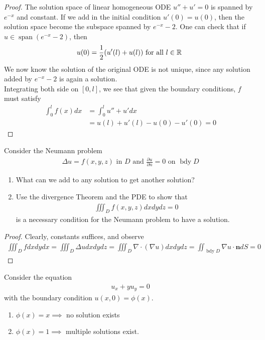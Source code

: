 \documentclass{report}
\begin{document}
\begin{proof}
The solution space of linear homogeneous ODE $u''+u'=0$  is spanned by $e^{-x}$ and constant. If we add in the initial condition  $u'(0)=u(0)$, then the solution space become the subspace spanned by $e^{-x}-2$. One can check that if $u \in\operatorname{span}(e^{-x}-2)$, then 
\begin{align*}
u(0)=\frac{1}{2}(u'(l)+u(l))\text{ for all $l\in\mathbb{R}$ }
\end{align*}
We now know the solution of the original ODE is not unique, since any solution added by $e^{-x}-2$ is again a solution. \\

Integrating both side on $[0,l]$, we see that given the boundary conditions, $f$ must satisfy 
\begin{align*}
\int_0^l f(x)dx&=\int_0^l u''+u'dx\\
&=u(l)+u'(l)-u(0)-u'(0)=0
\end{align*}
\end{proof}
\begin{question}{}{}
Consider the Neumann problem 
\begin{align*}
\Delta u=f(x,y,z)\text{ in }D\text{ and } \frac{\partial u}{\partial n}=0\text{ on }\operatorname{bdy}D
\end{align*}
\begin{enumerate}[label=(\alph*)]
  \item What can we add to any solution to get another solution? 
  \item Use the divergence Theorem and the PDE to show that 
  \begin{align*}
  \iiint_D f(x,y,z)dxdydz=0
  \end{align*}
  is a necessary condition for the Neumann problem to have a solution. 
\end{enumerate}
\end{question}
\begin{proof}
Clearly, constants suffices, and observe 
\begin{align*}
\iiint_D fdxdydx=\iiint_D \Delta u dxdydz= \iiint_D \nabla \cdot (\nabla u)dxdydz = \iint_{\operatorname{bdy}D} \nabla u \cdot \textbf{n}dS= 0
\end{align*}
\end{proof}
\begin{question}{}{}
Consider the equation 
\begin{align*}
u_x+yu_y=0 
\end{align*}
with the boundary condition $u(x,0)=\phi (x)$. 
\begin{enumerate}[label=(\alph*)]
  \item $\phi (x)=x \implies $ no solution exists
  \item $\phi (x)=1 \implies $ multiple solutions exist.
\end{enumerate}
\end{question}
\end{document}
